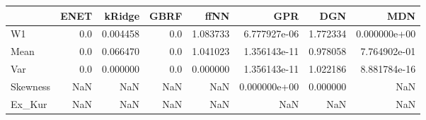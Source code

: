 \begin{tabular}{lrrrrrrr}
\toprule
{} &  ENET &    kRidge &  GBRF &      ffNN &           GPR &       DGN &           MDN \\
\midrule
W1       &   0.0 &  0.004458 &   0.0 &  1.083733 &  6.777927e-06 &  1.772334 &  0.000000e+00 \\
Mean     &   0.0 &  0.066470 &   0.0 &  1.041023 &  1.356143e-11 &  0.978058 &  7.764902e-01 \\
Var      &   0.0 &  0.000000 &   0.0 &  0.000000 &  1.356143e-11 &  1.022186 &  8.881784e-16 \\
Skewness &   NaN &       NaN &   NaN &       NaN &  0.000000e+00 &  0.000000 &           NaN \\
Ex\_Kur   &   NaN &       NaN &   NaN &       NaN &           NaN &       NaN &           NaN \\
\bottomrule
\end{tabular}
